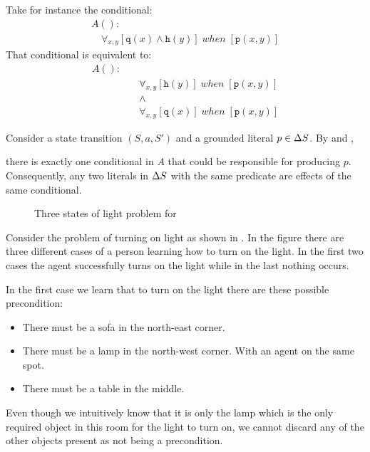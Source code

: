 \documentclass[\master/Master.tex]{subfiles}
\begin{document}
\begin{example}
	Take for instance the conditional:	
	\begin{align*}
		&A():&  \\
		&\quad
		\forall_{x, y}
			\left[
				\texttt{q}(x) \land \texttt{h}(y)
			\right]
		\; when \;
		\left[ \texttt{p}(x,y) \right]
	\end{align*}		
	That conditional is equivalent to: 
	\begin{align*}
		A():&  \\
			 &\quad\forall_{x, y}
				\left[
				\texttt{h}(y)
				\right]
				\; when \;
				\left[ \texttt{p}(x,y) \right] \\
		&\quad\land 	\\		
		&\quad\forall_{x, y}
		\left[
		\texttt{q}(x)
		\right]
		\; when \;
		\left[ \texttt{p}(x,y) \right]
	\end{align*}
	
\end{example}



\begin{proposition}\label{prop:ca:singleConditional}
    Consider a state transition $\left(S, a, S'\right)$ and a grounded literal $p \in \Delta S$. By  and , 
    
    there is exactly one conditional in $A$ that could be responsible for producing $p$. Consequently, any two literals in $\Delta S$ with the same predicate are effects of the same conditional.
\end{proposition}

\begin{figure}
	\caption{\label{fig:ca:house-example}Three states of light problem for }
\end{figure}

\begin{example}\label{ex:ca:light-on}
Consider the problem of turning on light as shown in .
In the figure there are three different cases of a person learning how to turn on the
light. In the first two cases the agent successfully turns on the light while in the last nothing occurs.

In the first case we learn that to turn on the light there are these possible precondition:
\begin{itemize}
	\item There must be a sofa in the north-east corner.
	\item There must be a lamp in the north-west corner. With an agent on the same spot.
	\item There must be a table in the middle.
\end{itemize}
Even though we intuitively know that it is only the lamp which is the only required object in this room for the light to turn on, we cannot discard any of the other objects present as not being a precondition.
\end{example}
\end{document}
